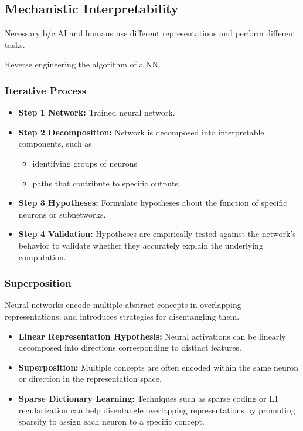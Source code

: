 \subsection{Mechanistic Interpretability}
\begin{motivation}
    Necessary b/c AI and humans use different representations and perform different tasks. 
\end{motivation}
\begin{definition}
    Reverse engineering the algorithm of a NN.
\end{definition}

\subsubsection{Iterative Process}
\begin{notes}
    \begin{itemize}
        \item \textbf{Step 1 Network:} Trained neural network.
        \item \textbf{Step 2 Decomposition:} Network is decomposed into interpretable components, such as 
        \begin{itemize}
            \item identifying groups of neurons
            \item paths that contribute to specific outputs.
        \end{itemize}
        \item \textbf{Step 3 Hypotheses:} Formulate hypotheses about the function of specific neurons or subnetworks. 
        \item \textbf{Step 4 Validation:} Hypotheses are empirically tested against the network's behavior to validate whether they accurately explain the underlying computation.
    \end{itemize}    
\end{notes}

\subsubsection{Superposition}
\begin{notes} Neural networks encode multiple abstract concepts in overlapping representations, and introduces strategies for disentangling them.
    \begin{itemize}
        \item \textbf{Linear Representation Hypothesis:} Neural activations can be linearly decomposed into directions corresponding to distinct features. 
        \item \textbf{Superposition:} Multiple concepts are often encoded within the same neuron or direction in the representation space.
        \item \textbf{Sparse Dictionary Learning:} Techniques such as sparse coding or L1 regularization can help disentangle overlapping representations by promoting sparsity to assign each neuron to a specific concept.
    \end{itemize}    
\end{notes}
\newpage

